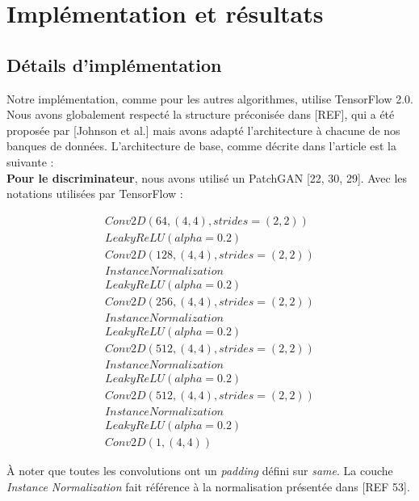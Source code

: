 \section{Implémentation et résultats}

\subsection{Détails d'implémentation}

Notre implémentation, comme pour les autres algorithmes, utilise TensorFlow 2.0. Nous avons globalement respecté la structure préconisée dans [REF], qui a été proposée par [Johnson  et  al.] mais avons adapté l'architecture à chacune de nos banques de données. L'architecture de base, comme décrite dans l'article est la suivante : \\

\textbf{Pour le discriminateur}, nous avons utilisé un PatchGAN [22, 30, 29]. Avec les notations utilisées par TensorFlow :


\[ \begin{array}{lcr}
Conv2D(64, (4,4), strides=(2,2)) \\
LeakyReLU(alpha=0.2) \\

Conv2D(128, (4,4), strides=(2,2)) \\
InstanceNormalization\\
LeakyReLU(alpha=0.2)\\

Conv2D(256, (4,4), strides=(2,2)) \\
InstanceNormalization\\
LeakyReLU(alpha=0.2)\\

Conv2D(512, (4,4), strides=(2,2)) \\
InstanceNormalization\\
LeakyReLU(alpha=0.2)\\

Conv2D(512, (4,4), strides=(2,2)) \\
InstanceNormalization\\
LeakyReLU(alpha=0.2)\\

Conv2D(1, (4,4))\end{array}\]

À noter que toutes les convolutions ont un \textit{padding} défini sur \textit{same}. La couche \textit{Instance Normalization} fait référence à la normalisation présentée dans [REF 53]. \\

